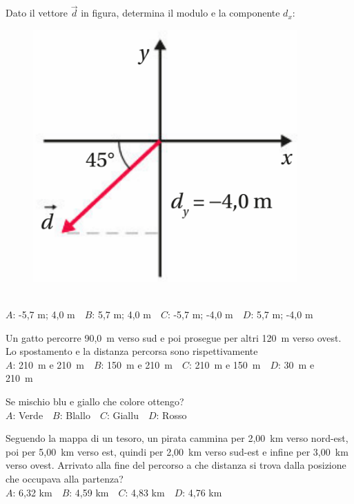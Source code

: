 \mcquestionheader Dato il vettore $\vec{d}$ in figura, determina il modulo e la componente $d_x$: \begin{figure}[h!]   \begin{center}     \includegraphics[scale=0.35]{vettored.png}   \end{center} \end{figure}\\
{$A$}: -5,7 m; 4,0 m\ \ {$B$}: 5,7 m; 4,0 m\ \ {$C$}: -5,7 m; -4,0 m\ \ {$D$}: 5,7 m; -4,0 m\ \ 

\mcquestionfooter



\def\mcquestionnumber{8}


\mcquestionheader Un gatto percorre 90,0~m verso sud e poi prosegue per altri 120~m verso ovest. Lo spostamento e la distanza percorsa sono rispettivamente\\
{$A$}: 210~m e 210~m\ \ {$B$}: 150~m e 210~m\ \ {$C$}: 210~m e 150~m\ \ {$D$}: 30~m e 210~m\ \ 

\mcquestionfooter



\def\mcquestionnumber{9}


\mcquestionheader Se mischio blu e giallo che colore ottengo?\\
{$A$}: Verde\ \ {$B$}: Blallo\ \ {$C$}: Giallu\ \ {$D$}: Rosso\ \ 

\mcquestionfooter



\def\mcquestionnumber{10}


\mcquestionheader Seguendo la mappa di un tesoro, un pirata cammina per 2,00~km verso nord-est, poi per 5,00~km verso est, quindi per 2,00~km verso sud-est e infine per 3,00~km verso ovest. Arrivato alla fine del percorso a che distanza si trova dalla posizione che occupava alla partenza?\\
{$A$}: 6,32 km\ \ {$B$}: 4,59 km\ \ {$C$}: 4,83 km\ \ {$D$}: 4,76 km\ \ 

